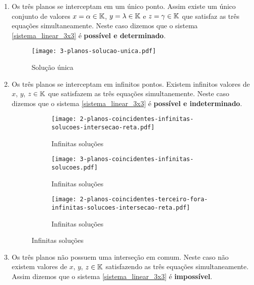 \begin{enumerate}
    \item Os três planos se interceptam em um único ponto. Assim existe um único conjunto de valores $x = \alpha \in \mathbb{K}$, $y = \lambda \in \mathbb{K}$ e $z = \gamma \in \mathbb{K}$  que satisfaz as três equações simultaneamente.  Neste caso dizemos que o sistema \eqref{sistema_linear_3x3}  é \textbf{possível e determinado}.
        \begin{figure}[h]
            \centering
            \texttt{[image: 3-planos-solucao-unica.pdf]}
                \caption{Solução única}
        \end{figure}
    \item Os três planos se interceptam em infinitos pontos. Existem infinitos valores de $x$, $y$, $z \in \mathbb{K}$ que satisfazem as três equações simultanemente. Neste caso dizemos que o sistema \eqref{sistema_linear_3x3} é \textbf{possível e indeterminado}.
        \begin{figure}[h]
            \centering
            \begin{subfigure}{.32\textwidth}
                \centering
                \texttt{[image: 2-planos-coincidentes-infinitas-solucoes-intersecao-reta.pdf]}
                \caption{Infinitas soluções}
            \end{subfigure}
            \begin{subfigure}{.32\textwidth}
                \centering
                \texttt{[image: 3-planos-coincidentes-infinitas-solucoes.pdf]}
                \caption{Infinitas soluções}
            \end{subfigure}
            \begin{subfigure}{.32\textwidth}
                \centering
                \texttt{[image: 2-planos-coincidentes-terceiro-fora-infinitas-solucoes-intersecao-reta.pdf]}
                \caption{Infinitas soluções}
            \end{subfigure}
        \end{figure}
    \item Os três planos não possuem uma interseção em comum. Neste caso não existem valores de $x$, $y$, $z \in \mathbb{K}$  satisfazendo as três equações simultaneamente. Assim dizemos que o sistema \eqref{sistema_linear_3x3}  é \textbf{impossível}.
        \begin{figure}[h]
            \centering
            \begin{subfigure}{.32\textwidth}

\end{subfigure}
\end{figure}
\end{enumerate}
